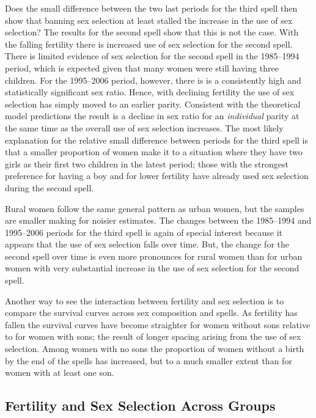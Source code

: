 \documentclass[12pt,letterpaper]{article}
\begin{document}
Does the small difference between the two last periods for the third spell then show that 
banning sex selection at least stalled the increase in the use of sex selection?
The results for the second spell show that this is not the case.
With the falling fertility there is increased use of sex selection for the 
second spell.
There is limited evidence of sex selection for the second spell in the 1985--1994 
period, which is expected given that many women were still having 
three children.
For the 1995--2006 period, however, there is is a consistently high and 
statistically significant sex ratio.
Hence, with declining fertility the use of sex selection has simply moved to an
earlier parity.
Consistent with the theoretical model predictions the result is a decline in 
sex ratio for an \emph{individual} parity at the same time as the overall
use of sex selection increases.
The most likely explanation for the relative small difference between periods for 
the third spell is that a smaller proportion of women make it to a situation
where they have two girls as their first two children in the latest period;
those with the strongest preference for having a boy and for lower fertility have 
already used sex selection during the second spell.

Rural women follow the same general pattern as urban women, but the samples are smaller
making for noisier estimates.
The changes between the 1985--1994 and 1995--2006 periods for the third spell is again
of special interest because it appears that the use of sex selection falls over time.
But, the change for the second spell over time is even more pronounces for rural women
than for urban women with very substantial increase in the use of sex selection for
the second spell.

Another way to see the interaction between fertility and sex selection is to compare
the survival curves across sex composition and spells.
As fertility has fallen the survival curves have become straighter for
women without sons relative to for women with sons;
the result of longer spacing arising from the use of sex selection.
Among women with no sons the proportion of women without a birth by the end of 
the spells has increased, but to a much smaller extent than for women with 
at least one son.


\subsection{Fertility and Sex Selection Across Groups}
\end{document}
